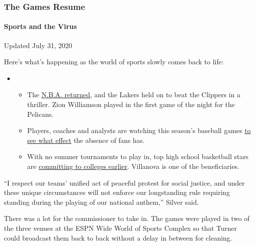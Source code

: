 \hypertarget{the-games-resume}{%
\subsubsection{The Games Resume}\label{the-games-resume}}

\hypertarget{sports-and-the-virus}{%
\paragraph{Sports and the Virus}\label{sports-and-the-virus}}

Updated July 31, 2020

Here's what's happening as the world of sports slowly comes back to
life:

\begin{itemize}
\item
  \begin{itemize}
  \tightlist
  \item
    The
    \href{https://www.nytimes3xbfgragh.onion/2020/07/30/sports/basketball/clippers-lakers.html?action=click\&pgtype=Article\&state=default\&region=MAIN_CONTENT_2\&context=storylines_keepup}{N.B.A.
    returned}, and the Lakers held on to beat the Clippers in a
    thriller. Zion Williamson played in the first game of the night for
    the Pelicans.
  \item
    Players, coaches and analysts are watching this season's baseball
    games
    \href{https://www.nytimes3xbfgragh.onion/2020/07/31/sports/baseball/baseball-empty-stadiums-effects.html?action=click\&pgtype=Article\&state=default\&region=MAIN_CONTENT_2\&context=storylines_keepup}{to
    see what effect} the absence of fans has.
  \item
    With no summer tournaments to play in, top high school basketball
    stars are
    \href{https://www.nytimes3xbfgragh.onion/2020/07/30/sports/ncaabasketball/college-basketball-recruiting.html?action=click\&pgtype=Article\&state=default\&region=MAIN_CONTENT_2\&context=storylines_keepup}{committing
    to colleges earlier}. Villanova is one of the beneficiaries.
  \end{itemize}
\end{itemize}

``I respect our teams' unified act of peaceful protest for social
justice, and under these unique circumstances will not enforce our
longstanding rule requiring standing during the playing of our national
anthem,'' Silver said.

There was a lot for the commissioner to take in. The games were played
in two of the three venues at the ESPN Wide World of Sports Complex so
that Turner could broadcast them back to back without a delay in between
for cleaning.

